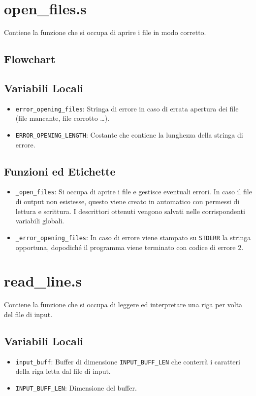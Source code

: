 \documentclass[a4paper,11pt]{article}
\newcommand{\itemtt}[1]{\item \texttt{#1}}
\begin{document}
	\section{open\_files.s}
	Contiene la funzione che si occupa di aprire i file in modo corretto.
	
	\subsection{Flowchart}
	\begin{center}
		\begin{tikzpicture}[node distance = 2cm, auto]
		\end{tikzpicture}
	\end{center}
	\subsection{Variabili Locali} 
	\begin{itemize}
		\itemtt{error\_opening\_files}: Stringa di errore in caso di errata apertura dei file (file mancante, file corrotto \ldots).
		\itemtt{ERROR\_OPENING\_LENGTH}: Costante che contiene la lunghezza della stringa di errore.
	\end{itemize}
	
	\subsection{Funzioni ed Etichette}
	\begin{itemize}
		\itemtt{\_open\_files}: Si occupa di aprire i file e gestisce eventuali errori. In caso il file di output non esistesse, questo viene creato in automatico con permessi di lettura e scrittura. I descrittori ottenuti vengono salvati nelle corrispondenti variabili globali. 
		\itemtt{\_error\_opening\_files}: In caso di errore viene stampato su \texttt{STDERR} la stringa opportuna, dopodiché il programma viene terminato con codice di errore 2. 
	\end{itemize}
	
	\section{read\_line.s}
	Contiene la funzione che si occupa di leggere ed interpretare una riga per volta del file di input.
	\subsection{Variabili Locali}
	\begin{itemize}
		\itemtt{input\_buff}: Buffer di dimensione \texttt{INPUT\_BUFF\_LEN} che conterrà i caratteri della riga letta dal file di input.
		\itemtt{INPUT\_BUFF\_LEN}: Dimensione del buffer.
	\end{itemize}
	
\end{document}
